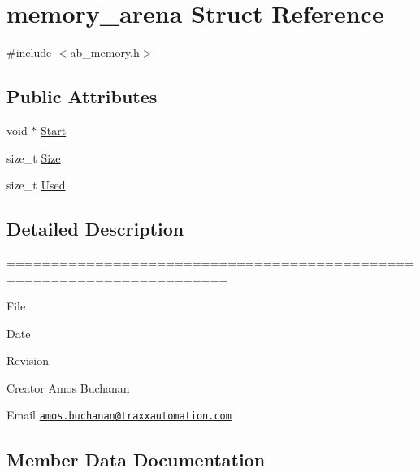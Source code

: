 \hypertarget{structmemory__arena}{}\section{memory\+\_\+arena Struct Reference}
\label{structmemory__arena}


{\ttfamily \#include $<$ab\+\_\+memory.\+h$>$}

\subsection*{Public Attributes}
\begin{DoxyCompactItemize}
\item 
void $\ast$ \hyperlink{structmemory__arena_a165e8a081bbf8241543164a8a0c580ea}{Start}
\item 
size\+\_\+t \hyperlink{structmemory__arena_ab3f96c20bd889e66879338831549af70}{Size}
\item 
size\+\_\+t \hyperlink{structmemory__arena_abbc4860a3014af6eae9d663a4e1e12d9}{Used}
\end{DoxyCompactItemize}


\subsection{Detailed Description}
======================================================================= \begin{DoxyParagraph}{File}

\end{DoxyParagraph}
\begin{DoxyParagraph}{Date}

\end{DoxyParagraph}
\begin{DoxyParagraph}{Revision}

\end{DoxyParagraph}
\begin{DoxyParagraph}{Creator}
Amos Buchanan 
\end{DoxyParagraph}
\begin{DoxyParagraph}{Email}
\href{mailto:amos.buchanan@traxxautomation.com}{\tt amos.\+buchanan@traxxautomation.\+com} 
\end{DoxyParagraph}
\subsection*{}

\subsection{Member Data Documentation}
\mbox{\label{structmemory__arena_ab3f96c20bd889e66879338831549af70}} 
